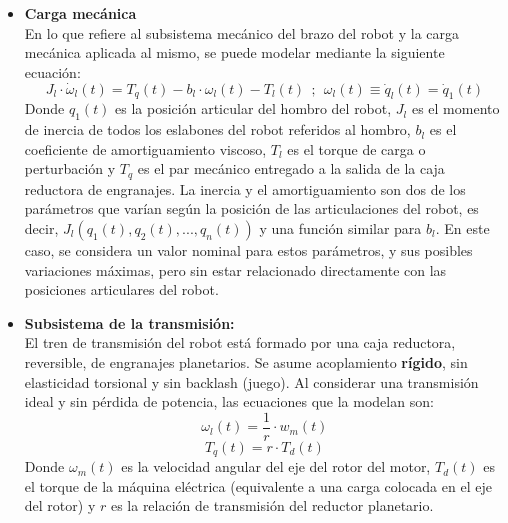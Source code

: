 \documentclass[10pt]{article}
\begin{document}
\begin{itemize}
	\item \textbf{Carga mecánica}\vspace{0.3cm}\\
	En lo que refiere al subsistema mecánico del brazo del robot y la carga mecánica aplicada al mismo, se puede modelar mediante la siguiente ecuación:
	\begin{equation}
		\label{eqn:cargaMecanica}
		J_{l}\cdot \dot{\omega }_{l}\left ( t \right )=T_{q}\left ( t \right )-b_{l}\cdot \omega_{l}\left ( t \right )-T_{l}\left ( t \right ) \ \ ;\ \ \omega_{l}\left ( t \right )\equiv \dot{q}_{l}\left ( t \right )= \dot{q}_1\left ( t \right )
	\end{equation}
	Donde $q_{1}(t)$ es la posición articular del hombro del robot, $J_{l}$ es el momento de inercia de todos los eslabones del robot referidos al hombro, $b_{l}$ es el coeficiente de amortiguamiento viscoso, $T_{l}$ es el torque de carga o perturbación y $T_{q}$ es el par mecánico entregado a la salida de la caja reductora de engranajes.
	La inercia y el amortiguamiento son dos de los parámetros que varían según la posición de las articulaciones del robot, es decir, $J_{l}(q_{1}(t),q_{2}(t),...,q_{n}(t))$ y una función similar para $b_{l}$.
	En este caso, se considera un valor nominal para estos parámetros, y sus posibles variaciones máximas, pero sin estar relacionado directamente con las posiciones articulares del robot.
	
	\item \textbf{Subsistema de la transmisión:}\vspace{0.3cm}\\
	El tren de transmisión del robot está formado por una caja reductora, reversible, de engranajes planetarios. Se asume acoplamiento \textbf{rígido}, sin elasticidad torsional y sin backlash (juego). Al considerar una transmisión ideal y sin pérdida de potencia, las ecuaciones que la modelan son:
	\begin{equation}
		\label{eqn:relacionTransmision}
		\omega_{l}\left ( t \right )=\frac{1}{r}\cdot w_{m}\left ( t \right )
	\end{equation}
	\begin{equation}
		\label{eqn:torqueTransmision}
		T_{q}\left ( t \right )=r\cdot T_{d}\left ( t \right )
	\end{equation}
	Donde $\omega_{m}(t)$ es la velocidad angular del eje del rotor del motor, $T_{d}(t)$ es el torque de la máquina eléctrica (equivalente a una carga colocada en el eje del rotor) y $r$ es la relación de transmisión del reductor planetario.
	

\end{itemize}
\end{document}
